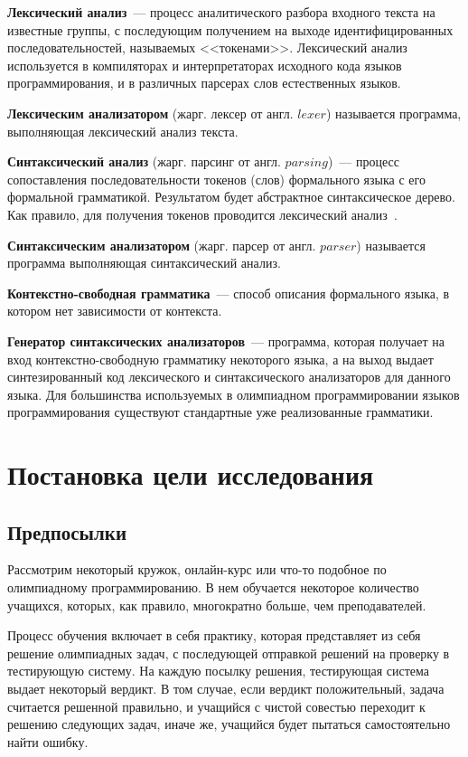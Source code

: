 \textbf{Лексический анализ}~--- процесс аналитического разбора 
входного текста на известные группы, с последующим получением на выходе 
идентифицированных последовательностей, называемых <<токенами>>. 
Лексический анализ используется в компиляторах и интерпретаторах исходного кода языков программирования, 
и в различных парсерах слов естественных языков.

\textbf{Лексическим анализатором} (жарг. лексер от англ. $lexer$) называется программа, выполняющая лексический анализ текста.

\textbf{Синтаксический анализ} (жарг. парсинг от англ. $parsing$)~--- процесс сопоставления последовательности токенов (слов)
формального языка с его формальной грамматикой. Результатом будет абстрактное синтаксическое дерево. Как правило, для получения
токенов проводится лексический анализ~\cite{syntax}.

\textbf{Синтаксическим анализатором} (жарг. парсер от англ. $parser$) называется программа выполняющая синтаксический анализ.

\textbf{Контекстно-свободная грамматика}~---  способ описания формального языка, в котором нет зависимости от контекста.

\textbf{Генератор синтаксических анализаторов}~--- программа, которая получает на вход контекстно-свободную грамматику 
некоторого языка, а на выход выдает синтезированный код лексического и синтаксического анализаторов для данного языка.
Для большинства используемых в олимпиадном программировании языков программирования 
существуют стандартные уже реализованные грамматики.

\section{Постановка цели исследования}
\subsection{Предпосылки}

Рассмотрим некоторый кружок, онлайн-курс или что-то подобное по олимпиадному программированию. 
В нем обучается некоторое количество учащихся, которых, как правило, многократно больше, чем преподавателей.

Процесс обучения включает в себя практику, которая представляет из себя решение олимпиадных задач, с последующей
отправкой решений на проверку в тестирующую систему. На каждую посылку решения, тестирующая система выдает некоторый вердикт.
В том случае, если вердикт положительный, задача считается решенной правильно, и учащийся с чистой совестью переходит к решению
следующих задач, иначе же, учащийся будет пытаться самостоятельно найти ошибку.

